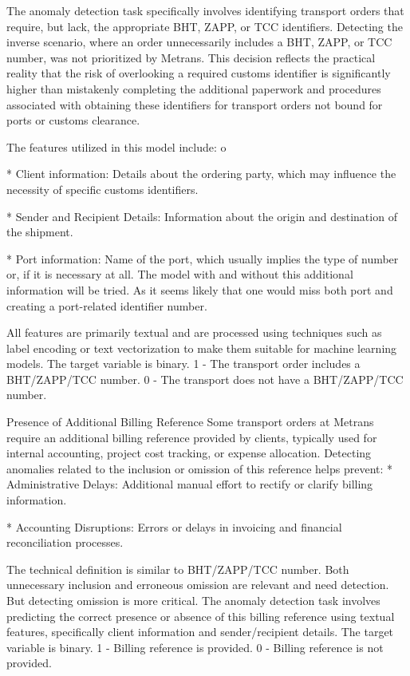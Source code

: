 The anomaly detection task specifically involves identifying transport orders that require, but lack, the appropriate BHT, ZAPP, or TCC identifiers. Detecting the inverse scenario, where an order unnecessarily includes a BHT, ZAPP, or TCC number, was not prioritized by Metrans. This decision reflects the practical reality that the risk of overlooking a required customs identifier is significantly higher than mistakenly completing the additional paperwork and procedures associated with obtaining these identifiers for transport orders not bound for ports or customs clearance.

The features utilized in this model include:
\begitems \style o

* Client information: Details about the ordering party, which may influence the necessity of specific customs identifiers.

* Sender and Recipient Details: Information about the origin and destination of the shipment.

* Port information: Name of the port, which usually implies the type of number or, if it is necessary at all. The model with and without this additional information will be tried. As it seems likely that one would miss both port and creating a port-related identifier number.
\enditems

All features are primarily textual and are processed using techniques such as label encoding or text vectorization to make them suitable for machine learning models. The target variable is binary. 1 - The transport order includes a BHT/ZAPP/TCC number. 0 - The transport does not have a BHT/ZAPP/TCC number.

\secc Presence of Additional Billing Reference
Some transport orders at Metrans require an additional billing reference provided by clients, typically used for internal accounting, project cost tracking, or expense allocation. Detecting anomalies related to the inclusion or omission of this reference helps prevent:
\begitems
* Administrative Delays: Additional manual effort to rectify or clarify billing information.

* Accounting Disruptions: Errors or delays in invoicing and financial reconciliation processes.
\enditems

The technical definition is similar to BHT/ZAPP/TCC number. Both unnecessary inclusion and erroneous omission are relevant and need detection. But detecting omission is more critical. The anomaly detection task involves predicting the correct presence or absence of this billing reference using textual features, specifically client information and sender/recipient details. The target variable is binary. 1 - Billing reference is provided. 0 - Billing reference is not provided.

